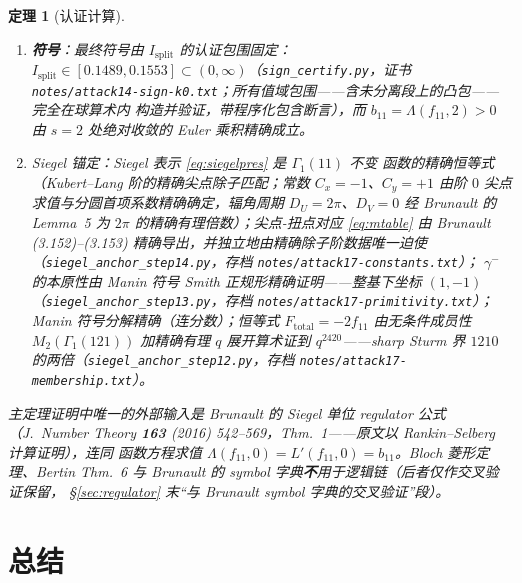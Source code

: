 \documentclass[11pt,a4paper]{ctexart}
\newtheorem{theorem}{定理}
\theoremstyle{remark}
\newcommand{\bN}{b_{11}}
\newcommand{\Isplit}{I_{\mathrm{split}}}
\begin{document}
\begin{theorem}[认证计算]
\begin{enumerate}[nosep]
$\mathrm{class}(C')=2\gamma^-$。
\item \textbf{符号}：最终符号由 $\Isplit$ 的认证包围固定：
$\Isplit\in[0.1489,0.1553]\subset(0,\infty)$（\texttt{sign\_certify.py}，证书
\texttt{notes/attack14-sign-k0.txt}；所有值域包围——含未分离段上的凸包——完全在球算术内
构造并验证，带程序化包含断言），而 $\bN=\Lambda(f_{11},2)>0$ 由 $s=2$ 处绝对收敛的
Euler 乘积精确成立。
\item \emph{Siegel 锚定}：Siegel 表示 \eqref{eq:siegelpres} 是 $\Gamma_1(11)$ 不变
函数的精确恒等式（Kubert--Lang 阶的精确尖点除子匹配；常数 $C_x=-1$、$C_y=+1$ 由阶
$0$ 尖点求值与分圆首项系数精确确定，辐角周期 $D_U=2\pi$、$D_V=0$ 经 Brunault 的
Lemma~5 为 $2\pi$ 的精确有理倍数）；尖点-扭点对应 \eqref{eq:mtable} 由 Brunault
(3.152)--(3.153) 精确导出，并独立地由精确除子阶数据唯一迫使
（\texttt{siegel\_anchor\_step14.py}，存档 \texttt{notes/attack17-constants.txt}）；
$\gamma^-$ 的本原性由 Manin 符号 Smith 正规形精确证明——整基下坐标 $(1,-1)$
（\texttt{siegel\_anchor\_step13.py}，存档 \texttt{notes/attack17-primitivity.txt}）；
Manin 符号分解精确（连分数）；恒等式 $F_{\mathrm{total}}=-2f_{11}$ 由无条件成员性
$M_2(\Gamma_1(121))$ 加精确有理 $q$ 展开算术证到 $q^{2420}$——sharp Sturm 界 $1210$
的两倍（\texttt{siegel\_anchor\_step12.py}，存档
\texttt{notes/attack17-membership.txt}）。
\end{enumerate}
主定理证明中唯一的外部输入是 Brunault 的 Siegel 单位 regulator 公式（J.~Number
Theory \textbf{163} (2016) 542--569，Thm.~1——原文以 Rankin--Selberg 计算证明），连同
函数方程求值 $\Lambda(f_{11},0)=L'(f_{11},0)=\bN$。Bloch 菱形定理、Bertin Thm.~6 与
Brunault 的 symbol 字典\textbf{不}用于逻辑链（后者仅作交叉验证保留，
\S\ref{sec:regulator} 末``与 Brunault symbol 字典的交叉验证''段）。
\end{theorem}

\section{总结}
\end{document}
